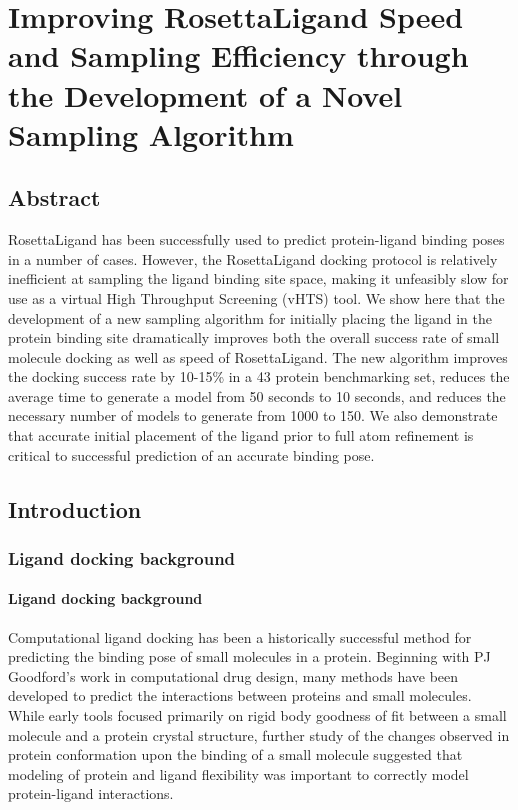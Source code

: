 \chapter{Improving RosettaLigand Speed and Sampling Efficiency through the Development of a Novel Sampling Algorithm}

\section{Abstract}

RosettaLigand has been successfully used to predict protein-ligand binding poses in a number of cases\citep{Turlington:2013et,Davis:2009fx,Combs:2013bl}.
However, the RosettaLigand docking protocol is relatively inefficient at sampling the ligand binding site space, making it unfeasibly slow for use as a virtual High Throughput Screening (vHTS) tool.
We show here that the development of a new sampling algorithm for initially placing the ligand in the protein binding site dramatically improves both the overall success rate of small molecule docking as well as speed of RosettaLigand.
The new algorithm improves the docking success rate by 10-15\% in a 43 protein benchmarking set, reduces the average time to generate a model from 50 seconds to 10 seconds, and reduces the necessary number of models to generate from 1000 to 150.
We also demonstrate that accurate initial placement of the ligand prior to full atom refinement is critical to successful prediction of an accurate binding pose.

\section{Introduction}

\subsection{Ligand docking background}

\subsubsection{Ligand docking background}

Computational ligand docking has been a historically successful method for predicting the binding pose of small molecules in a protein.
Beginning with PJ Goodford's work in computational drug design\citep{Goodford:1985bf}, many methods have been developed to predict the interactions between proteins and small molecules.
While early tools focused primarily on rigid body goodness of fit between a small molecule and a protein crystal structure, further study of the changes observed in protein conformation upon the binding of a small molecule\citep{Bystroff:1991tl} suggested that modeling of protein and ligand flexibility was important to correctly model protein-ligand interactions.

